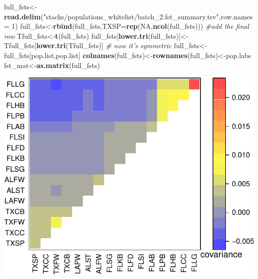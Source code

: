 \documentclass[]{article}
\newenvironment{Shaded}{\begin{snugshade}}{\end{snugshade}}
\newcommand{\KeywordTok}[1]{\textcolor[rgb]{0.13,0.29,0.53}{\textbf{#1}}}
\newcommand{\DataTypeTok}[1]{\textcolor[rgb]{0.13,0.29,0.53}{#1}}
\newcommand{\DecValTok}[1]{\textcolor[rgb]{0.00,0.00,0.81}{#1}}
\newcommand{\StringTok}[1]{\textcolor[rgb]{0.31,0.60,0.02}{#1}}
\newcommand{\CommentTok}[1]{\textcolor[rgb]{0.56,0.35,0.01}{\textit{#1}}}
\newcommand{\OtherTok}[1]{\textcolor[rgb]{0.56,0.35,0.01}{#1}}
\newcommand{\OperatorTok}[1]{\textcolor[rgb]{0.81,0.36,0.00}{\textbf{#1}}}
\newcommand{\NormalTok}[1]{#1}
\begin{document}
\begin{Shaded}
\begin{Highlighting}[]
\NormalTok{full_fsts<-}\KeywordTok{read.delim}\NormalTok{(}\StringTok{"stacks/populations_whitelist/batch_2.fst_summary.tsv"}\NormalTok{,}\DataTypeTok{row.names =} \DecValTok{1}\NormalTok{)}
\NormalTok{full_fsts<-}\KeywordTok{rbind}\NormalTok{(full_fsts,}\DataTypeTok{TXSP=}\KeywordTok{rep}\NormalTok{(}\OtherTok{NA}\NormalTok{,}\KeywordTok{ncol}\NormalTok{(full_fsts))) }\CommentTok{#add the final row}
\NormalTok{Tfull_fsts<-}\KeywordTok{t}\NormalTok{(full_fsts)}
\NormalTok{full_fsts[}\KeywordTok{lower.tri}\NormalTok{(full_fsts)]<-Tfull_fsts[}\KeywordTok{lower.tri}\NormalTok{(Tfull_fsts)] }\CommentTok{# now it's symmetric}
\NormalTok{full_fsts<-full_fsts[pop.list,pop.list]}
\KeywordTok{colnames}\NormalTok{(full_fsts)<-}\KeywordTok{rownames}\NormalTok{(full_fsts)<-pop.labs}
\NormalTok{fst_mat<-}\KeywordTok{as.matrix}\NormalTok{(full_fsts)}
\end{Highlighting}
\end{Shaded}

\begin{Shaded}
\end{Shaded}

\includegraphics{202_fwsw_reanalysis_files/figure-latex/unnamed-chunk-6-1}
\end{document}
